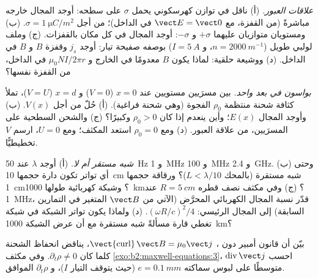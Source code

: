 \begin{exercise}[$\star\star$]\label{exo:b2:maxwell-equations:6}
\emph{علاقات العبور.} (أ) ناقل في توازن كهرسكوني
يحمل $\sigma$ على سطحه: أوجد المجال خارجه مباشرةً (من
القفزة، مع $\vect E = \vect 0$ في الداخل)؛ من أجل $\sigma = \qty{1}{\micro C/m^2}$. (ب) ومستويان
متوازيان عليهما $+\sigma$ و $-\sigma$: أوجد المجال في كل مكان بالقفزات.
(ج) وملف لولبي طويل ($n = \qty{2000}{m^{-1}}$، و $I = \qty{5}{A}$) بوصفه صفيحة
تيار: أوجد $j_s$ وقفزة $B$ و $B$ في الداخل. (د) ووشيعة حلقية: لماذا يكون $B$
معدومًا في الخارج و $\mu_0NI/2\pi r$ في الداخل، من القفزة نفسها؟
\end{exercise}

\begin{exercise}[$\star\star$]\label{exo:b2:maxwell-equations:7}
\emph{بواسون في بعد واحد.} بين مسرَيين مستويين عند $x = 0$
($V = 0$) و $x = d$ ($V = U$)، تملأ كثافة شحنة منتظمة $\rho_0$
الفجوة (وهي شحنة فراغية). (أ) حُلّ  من أجل $V(x)$. (ب) وأوجد المجال
$E(x)$؛ وأين ينعدم إذا كان $\rho_0 > 0$ وكبيرًا؟ (ج) والشحن السطحية على
المسرَيين، من علاقة العبور. (د) ومع $\rho_0 = 0$
استعد المكثف؛ ومع $U = 0$، ارسم $V$ تخطيطيًّا.
\end{exercise}

\begin{exercise}[$\star\star$]\label{exo:b2:maxwell-equations:8}
\emph{شبه مستقر أم لا.} (أ) أوجد $\lambda$ عند \qty{50}{Hz} و \qty{1}{MHz}
و \qty{100}{MHz} و \qty{2.4}{GHz}. (ب) وحتى أي تواتر تكون دارة حجمها \qty{10}{cm}
شبه مستقرة (بالمحك $L < \lambda/10$)؟ ورقاقة حجمها \qty{1}{cm}؟ وشبكة
كهربائية طولها \qty{1000}{km}؟ (ج) وفي مكثف نصف قطره $R = \qty{5}{cm}$ عند
\qty{1}{MHz}، قدّر نسبة المجال الكهربائي المحرَّض (الآتي من
$\vect B$ المتغير في التمارين السابقة) إلى المجال الرئيسي: $(\omega R/c)^2
/4$. (د) ولماذا يكون تواتر الشبكة في شبكة تغطي قارة مسألةً
شبه مستقرة مع أن عرض الشبكة \qty{1000}{km}؟
\end{exercise}

\begin{exercise}[$\star\star$]\label{exo:b2:maxwell-equations:9}
بيّن أن قانون أمبير دون ، $\operatorname{\vect{curl}}
\vect B = \mu_0\vect j$، يناقض انحفاظ الشحنة كلما كان $\partial_t\rho
\ne 0$. وفي مكثف \cref{exo:b2:maxwell-equations:3}، احسب
$\operatorname{div}\vect j$ متوسطًا على لبوس سماكته $e = \qty{0.1}{mm}$
(حيث يتوقف التيار $I$)، و $\partial_t\rho$ الموافق.
\end{exercise}

